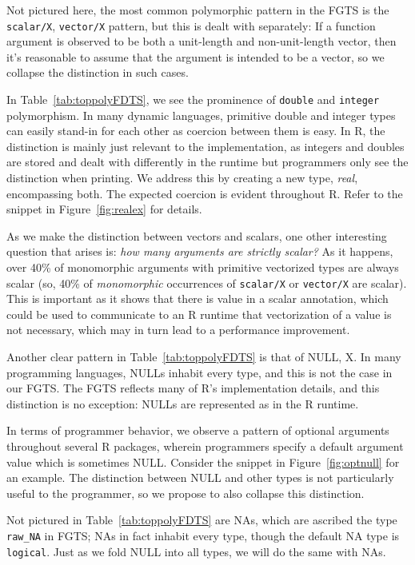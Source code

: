 \documentclass[acmsmall,10pt,review,anonymous]{acmart}\settopmatter{printfolios=true,printccs=false,printacmref=false}
\begin{document}
Not pictured here, the most common polymorphic pattern in the FGTS is the {\tt scalar/X}, {\tt vector/X} pattern, but this is dealt with separately:
If a function argument is observed to be both a unit-length and non-unit-length vector, then it's reasonable to assume that the argument is intended to be a vector, so we collapse the distinction in such cases.

In Table~\ref{tab:toppolyFDTS}, we see the prominence of {\tt double} and {\tt integer} polymorphism.
In many dynamic languages, primitive double and integer types can easily stand-in for each other as coercion between them is easy.
In R, the distinction is mainly just relevant to the implementation, as integers and doubles are stored and dealt with differently in the runtime but programmers only see the distinction when printing.
We address this by creating a new type, {\it real}, encompassing both.
The expected coercion is evident throughout R.
Refer to the snippet in Figure~\ref{fig:realex} for details.

As we make the distinction between vectors and scalars, one other interesting question that arises is: {\it how many arguments are strictly scalar?}
As it happens, over 40\% of monomorphic arguments with primitive vectorized types are always scalar (so, 40\% of {\it monomorphic} occurrences of {\tt scalar/X} or {\tt vector/X} are scalar).
This is important as it shows that there is value in a scalar annotation, which could be used to communicate to an R runtime that vectorization of a value is not necessary, which may in turn lead to a performance improvement.

Another clear pattern in Table~\ref{tab:toppolyFDTS} is that of NULL, X.
In many programming languages, NULLs inhabit every type, and this is not the case in our FGTS.
The FGTS reflects many of R's implementation details, and this distinction is no exception:
NULLs are represented as  in the R runtime.

In terms of programmer behavior, we observe a pattern of optional arguments throughout several R packages, wherein programmers specify a default argument value which is sometimes NULL.
Consider the snippet in Figure~\ref{fig:optnull} for an example.
The distinction between NULL and other types is not particularly useful to the programmer, so we propose to also collapse this distinction.

Not pictured in Table~\ref{tab:toppolyFDTS} are NAs, which are ascribed the type {\tt raw\_NA} in FGTS; NAs in fact inhabit every type, though the default NA type is {\tt logical}.
Just as we fold NULL into all types, we will do the same with NAs.
\end{document}
